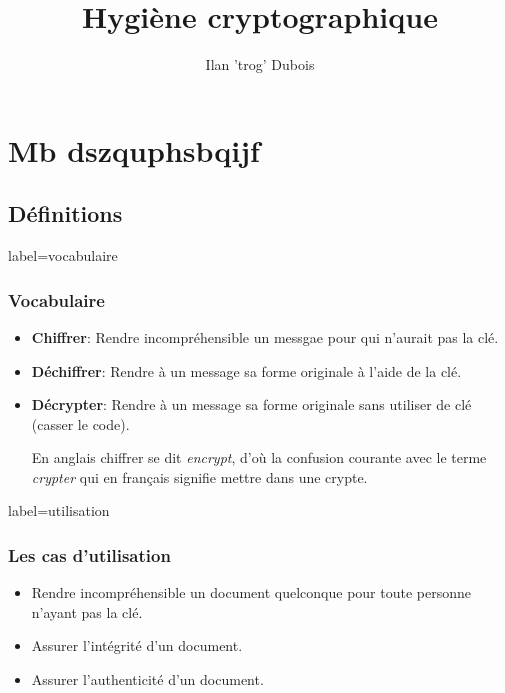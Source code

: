\documentclass{beamer}
\title{Hygiène cryptographique}
\author{\cc Ilan 'trog' Dubois}
\begin{document}
    \begin{frame}
        \titlepage
    \end{frame}
    \section{Mb dszquphsbqijf}
    \subsection{Définitions}
        \begin{frame}{label=vocabulaire}
            \frametitle{Vocabulaire}
            \begin{center}
                \begin{itemize}
                    \item \textbf{Chiffrer}: Rendre incompréhensible un messgae pour qui n'aurait pas la clé.
                    \item \textbf{Déchiffrer}: Rendre à un message sa forme originale à l'aide de la clé.
                    \item \textbf{Décrypter}: Rendre à un message sa forme originale sans utiliser de clé (casser le code).
                    \begin{tcolorbox}[colback=green!5,colframe=green!40!black,title=Mais crypter alors ?]
                      En anglais chiffrer se dit \textit{encrypt}, d'où la confusion courante avec le terme \textit{crypter} qui en français signifie mettre dans une crypte.
                    \end{tcolorbox}
                \end{itemize}
            \end{center}
        \end{frame}
        \begin{frame}{label=utilisation}
            \frametitle{Les cas d'utilisation}
            \begin{center}
                \begin{itemize}
                    \item Rendre incompréhensible un document quelconque pour toute personne n'ayant pas la clé.
                    \item Assurer l'intégrité d'un document.
                    \item Assurer l'authenticité d'un document.
                \end{itemize}
            \end{center}
        \end{frame}
\end{document}
